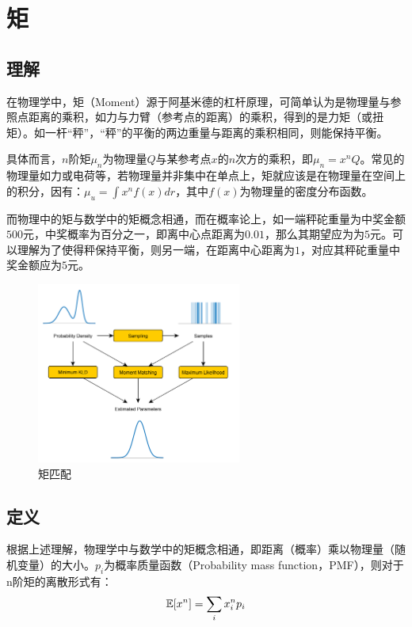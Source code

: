 \documentclass[11pt]{article}
\begin{document}
\section{矩}

\subsection{理解}

在物理学中，矩（Moment）源于阿基米德的杠杆原理，可简单认为是物理量与参照点距离的乘积，如力与力臂（参考点的距离）的乘积，得到的是力矩（或扭矩）。如一杆“秤”，“秤”的平衡的两边重量与距离的乘积相同，则能保持平衡。

具体而言，$n$阶矩$\mu_n$为物理量$Q$与某参考点$x$的$n$次方的乘积，即$\mu_n = x^n Q$。常见的物理量如力或电荷等，若物理量并非集中在单点上，矩就应该是在物理量在空间上的积分，因有：$\mu_u = \int x^n f(x) dr$，其中$f(x)$为物理量的密度分布函数。

而物理中的矩与数学中的矩概念相通，而在概率论上，如一端秤砣重量为中奖金额$500$元，中奖概率为百分之一，即离中心点距离为$0.01$，那么其期望应为为$5$元。可以理解为了使得秤保持平衡，则另一端，在距离中心距离为$1$，对应其秤砣重量中奖金额应为$5$元。

\begin{figure}[H]
    \centering
    \includegraphics[width=0.6\textwidth]{fig/moment-matching.png}
    \caption{矩匹配}
    \label{fig:moment-match}
\end{figure}

\subsection{定义}

根据上述理解，物理学中与数学中的矩概念相通，即距离（概率）乘以物理量（随机变量）的大小。$p_i$为概率质量函数（Probability mass function，PMF），则对于n阶矩的离散形式有：
\begin{equation*}
    \mathbb{E}[x^n] = \sum_i x_i^n p_i
\end{equation*}
\end{document}
